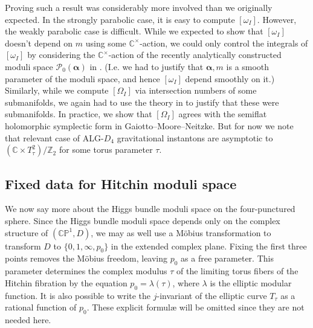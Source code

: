\documentclass[12pt,letterpaper,reqno]{amsart}
\def\mathbf#1{#1}%
\theoremstyle{remark}
\theoremstyle{definition}
\numberwithin{thm}{section}
\numberwithin{equation}{section}
\numberwithin{figure}{section}
\newcommand{\C}{\ensuremath{\mathbb C}}
\newcommand{\CP}{\ensuremath{\mathbb {CP}}}
\newcommand{\Z}{\ensuremath{\mathbb Z}}
\newcommand{\bsa}{\boldsymbol{\alpha}}
\newcommand{\bfm}{\mathbf{m}}
\begin{document}
\bigskip
Proving such a result was considerably more involved than we originally expected. In the strongly parabolic case, it is easy to compute $[\omega_I]$.  However, the weakly parabolic case is difficult. While we expected to show that $[\omega_I]$ doesn't depend on $\mathbf{m}$ using some $\C^\times$-action, we could only control the integrals of $[\omega_I]$ by considering the $\C^\times$-action of the recently analytically constructed moduli space $\mathcal{P}_0(\bsa)$ in \cite{collier2024conformallimitsparabolicslnchiggs}. (I.e. we had to justify that $\bsa, \bfm$ is a smooth parameter of the moduli space, and hence $[\omega_I]$ depend smoothly on it.)
Similarly, while we compute $[\Omega_I]$ via intersection numbers of some submanifolds, we again had to use the theory in \cite{collier2024conformallimitsparabolicslnchiggs} to justify that these were submanifolds. In practice, we show that $[\Omega_I]$ agrees with the semiflat holomorphic symplectic form in Gaiotto--Moore--Neitzke. 
 But for now we note that relevant case of ALG-$D_4$ gravitational instantons are asymptotic to $(\C \times T^2_\tau)/\Z_2$ for some torus parameter $\tau$.



\subsection{Fixed data for Hitchin moduli space}

We now say more about the Higgs bundle moduli space on the four-punctured sphere. Since the Higgs bundle moduli space depends only on the complex structure 
of $(\CP^1,D)$, we may as well use a M\"obius transformation to transform $D$ to $\{0, 1, \infty, p_0\}$ in the extended complex plane.  Fixing the first three points 
removes the M\"obius freedom, leaving $p_0$ as a free parameter.  This parameter determines the complex modulus $\tau$ of the limiting torus fibers of the Hitchin 
fibration by the equation $p_0 = \lambda(\tau)$, where $\lambda$ is the elliptic modular function. %
It is also possible to write the $j$-invariant of the elliptic curve $T_\tau$ as a rational function of $p_0$.  These explicit formul{\ae} will be omitted
since they are not needed here. 
\end{document}
